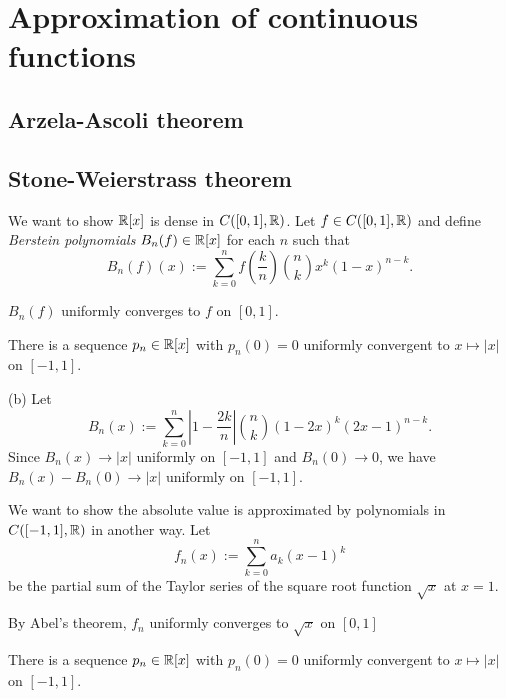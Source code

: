 \documentclass{../note}
\begin{document}
\chapter{Approximation of continuous functions}

\section{Arzela-Ascoli theorem}



















\section{Stone-Weierstrass theorem}

\begin{prb}
We want to show $\mathbb{R}[x]$ is dense in $C([0,1],\mathbb{R})$.
Let $f\in C([0,1],\mathbb{R})$ and define \emph{Berstein polynomials} $B_n(f)\in\mathbb{R}[x]$ for each $n$ such that
\[B_n(f)(x):=\sum_{k=0}^nf\left(\frac kn\right)\binom nkx^k(1-x)^{n-k}.\]
\begin{parts}
\item $B_n(f)$ uniformly converges to $f$ on $[0,1]$.
\item There is a sequence $p_n\in\mathbb{R}[x]$ with $p_n(0)=0$ uniformly convergent to $x\mapsto|x|$ on $[-1,1]$.
\end{parts}
\end{prb}
\begin{pf}
(b)
Let
\[B_n(x):=\sum_{k=0}^n\left|1-\frac{2k}n\right|\binom nk(1-2x)^k(2x-1)^{n-k}.\]
Since $B_n(x)\to|x|$ uniformly on $[-1,1]$ and $B_n(0)\to0$, we have $B_n(x)-B_n(0)\to|x|$ uniformly on $[-1,1]$.
\end{pf}

\begin{prb}
We want to show the absolute value is approximated by polynomials in $C([-1,1],\mathbb{R})$ in another way.
Let
\[f_n(x):=\sum_{k=0}^n a_k(x-1)^k\]
be the partial sum of the Taylor series of the square root function $\sqrt x$ at $x=1$.
\begin{parts}
\item By Abel's theorem, $f_n$ uniformly converges to $\sqrt x$ on $[0,1]$
\item There is a sequence $p_n\in\mathbb{R}[x]$ with $p_n(0)=0$ uniformly convergent to $x\mapsto|x|$ on $[-1,1]$.
\end{parts}
\end{prb}
\end{document}
